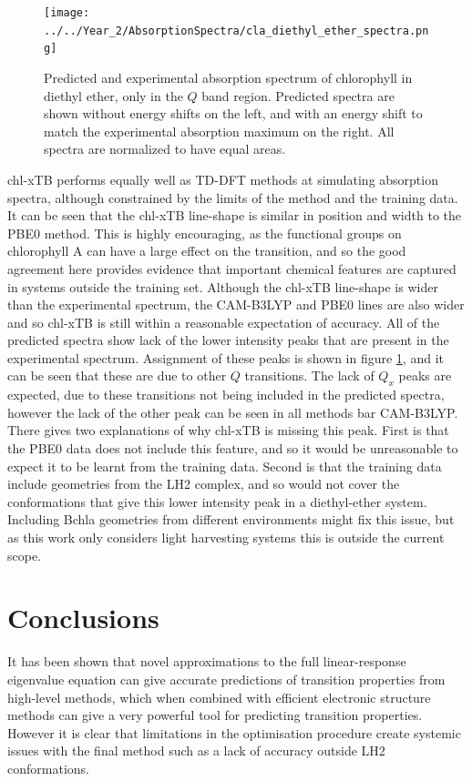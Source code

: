 \begin{figure}
    \centering
    \texttt{[image: ../../Year\_2/AbsorptionSpectra/cla\_diethyl\_ether\_spectra.png]}
    \caption{Predicted and experimental absorption spectrum of chlorophyll in diethyl 
    ether, only in the $Q$ band region. Predicted spectra are shown without energy
    shifts on the left, and with an energy shift to match the experimental absorption
    maximum on the right. All spectra are normalized to have equal areas.}
    \label{fig:chl_diethyl_ether}
\end{figure}

chl-xTB performs equally well as TD-DFT methods at simulating absorption spectra,
although constrained by the limits of the method and the training data. It can be
seen that the chl-xTB line-shape is similar in position and width to the PBE0 method.
This is highly encouraging, as the functional groups on chlorophyll A can have a
large effect on the \Qy transition, and so the good agreement here provides evidence
that important chemical features are captured in systems outside the training set.
Although the chl-xTB line-shape is wider than the experimental spectrum, the CAM-B3LYP
and PBE0 lines are also wider and so chl-xTB is still within a reasonable expectation 
of accuracy.
All of the predicted spectra show lack of the lower intensity peaks that are present 
in the experimental spectrum. Assignment of these peaks is shown in figure \ref{fig:chl_diethyl_ether},
and it can be seen that these are due to other $Q$ transitions. The lack of $Q_x$ 
peaks are expected, due to these transitions not being included in the predicted 
spectra, however the lack of the other \Qy peak can be seen in all methods bar CAM-B3LYP.
There gives two explanations of why chl-xTB is missing this peak. First is that the
PBE0 data does not include this feature, and so it would be unreasonable to expect
it to be learnt from the training data. Second is that the training data include 
geometries from the LH2 complex, and so would not cover the conformations that give
this lower intensity peak in a diethyl-ether system. Including Bchla geometries
from different environments might fix this issue, but as this work only considers
light harvesting systems this is outside the current scope.

\section{Conclusions}
\label{sec:chl_conclusions}

It has been shown that novel approximations to the full linear-response eigenvalue
equation can give accurate predictions of transition properties from high-level 
methods, which when combined with efficient electronic structure methods can give
a very powerful tool for predicting transition properties. However it is clear that
limitations in the optimisation procedure create systemic issues with the final
method such as a lack of accuracy outside LH2 conformations.


